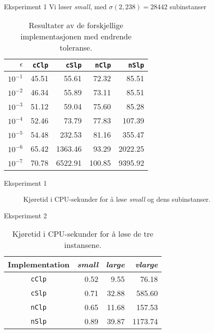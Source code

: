 \documentclass{beamer}
\begin{document}
\begin{frame}{Eksperiment 1}
Vi løser \textit{small}, med $\sigma(2, 238) = 28 442$ subinstanser
\begin{table}[ht!]
\centering
\caption{Resultater av de forskjellige implementasjonen med endrende toleranse.}
\begin{tabular}{rrrrr}
$\epsilon$ & \texttt{cClp} & \texttt{cSlp} & \texttt{nClp} & \texttt{nSlp} \\ \hline
$10^{-1}$ & 45.51 & 55.61 & 72.32 & 85.51 \\
$10^{-2}$ & 46.34 & 55.89 & 73.11 & 85.51 \\
$10^{-3}$ & 51.12 & 59.04 & 75.60 & 85.28 \\
$10^{-4}$ & 52.46 & 73.79 & 77.83 & 107.39 \\
$10^{-5}$ & 54.48 & 232.53 & 81.16 & 355.47 \\
$10^{-6}$ & 65.42 & 1363.46 & 93.29 & 2022.25 \\
$10^{-7}$ & 70.78 & 6522.91 & 100.85 & 9395.92
\end{tabular}
\label{table:expone}
\end{table}
\end{frame}



\begin{frame}{Eksperiment 1}
\begin{figure}[ht!]
    \centering
    
    \caption{Kjøretid i CPU-sekunder for å løse \textit{small} og dens subinstanser.}
    \label{fig:smalltolerance}
\end{figure}
\end{frame}



\begin{frame}{Eksperiment 2}
\begin{table}
\centering
\caption{Kjøretid i CPU-sekunder for å løse de tre instansene.}
\label{table:eps4instances}
\begin{tabular}{crrr}
\textrm{Implementation} & \textit{small} & \textit{large} & \textit{vlarge} \\ \hline
\texttt{cClp}           & 0.52           & 9.55           & 76.18 \\
\texttt{cSlp}           & 0.71           & 32.88          & 585.60 \\
\texttt{nClp}           & 0.65           & 11.68          & 157.53 \\
\texttt{nSlp}           & 0.89           & 39.87          & 1173.74
\end{tabular}
\end{table}
\end{frame}
\end{document}
